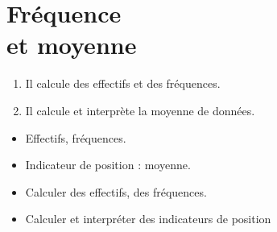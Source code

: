 \themaD
\graphicspath{{../../S27_Frequence_et_moyenne/Images/}}

\chapter{Fréquence\\et moyenne}
\label{S27}


\begin{autoeval}
   \small
   \begin{enumerate}
      \item Il calcule des effectifs et des fréquences.
      \item Il calcule et interprète la moyenne de données.
   \end{enumerate}
\end{autoeval}

\begin{prerequis}
   \begin{itemize}
      \item Effectifs, fréquences.
      \item Indicateur de position : moyenne.
      \item[\com] Calculer des effectifs, des fréquences.
      \item[\com] Calculer et interpréter des indicateurs de position
   \end{itemize}
\end{prerequis}

\vfill

